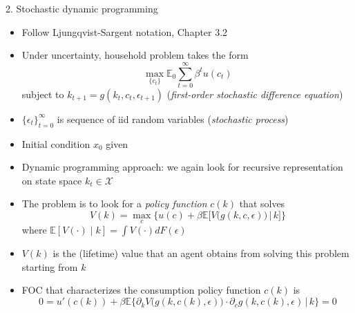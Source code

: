 \documentclass[10pt]{beamer}
\begin{document}
\begin{frame}{2. Stochastic dynamic programming}
\begin{itemize}
\item Follow Ljungqvist-Sargent notation, Chapter 3.2 

\item Under uncertainty, household problem takes the form 
\begin{equation*}
	\max_{ \{c_t\} } \mathbb E_0 \sum_{t=0}^\infty \beta^t u(c_t)
\end{equation*}
subject to $k_{t+1} = g(k_t, c_t, \epsilon_{t+1})$ \hspace{1mm} (\textit{first-order stochastic difference equation})

\item $\{\epsilon_t\}_{t=0}^\infty$ is sequence of iid random variables (\textit{stochastic process})

\item Initial condition $x_0$ given
\end{itemize}
\end{frame}


\begin{frame}{}
\begin{itemize}
\item Dynamic programming approach: we again look for recursive representation on state space $k_t \in \mathcal X$

\item The problem is to look for a \textit{policy function} $c(k)$ that solves 
\begin{equation*}
	V(k) = \max_{c} \bigg\{ u(c) + \beta \mathbb E \bigg[ V\Big( g(k, c, \epsilon) \Big) \, \Big| \, k \bigg] \bigg\}
\end{equation*}
where $\mathbb E[V(\cdot) \mid k] = \int V(\cdot) dF(\epsilon)$

\item $V(k)$ is the (lifetime) value that an agent obtains from solving this problem starting from $k$

\item FOC that characterizes the consumption policy function $c(k)$ is 
\begin{equation*}
	0 = u'(c(k)) + \beta \mathbb E \Big\{ \partial_k V \Big( g(k, c(k), \epsilon) \Big) \cdot \partial_c g(k, c(k), \epsilon) \, \Big| \, k \Big\} = 0
\end{equation*}
\end{itemize}
\end{frame}
\end{document}
